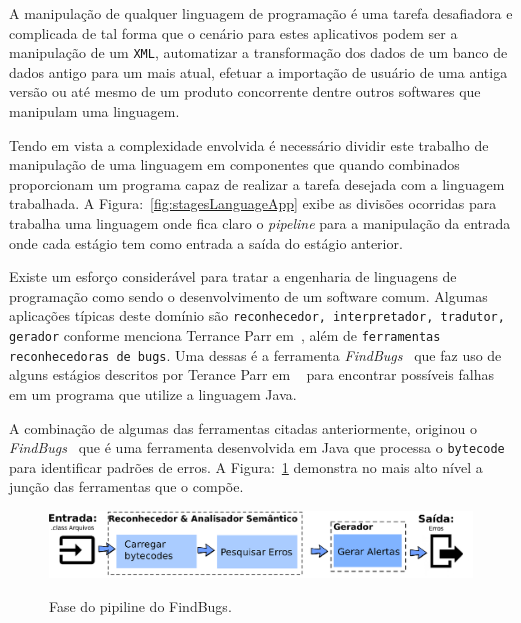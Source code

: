 A manipulaç\~{a}o de qualquer linguagem de programaç\~{a}o \'{e} uma tarefa desafiadora e complicada de tal forma que o cen\'{a}rio para estes aplicativos podem ser a manipulaç\~{a}o de um \texttt{XML}, automatizar a transformaç\~{a}o dos dados de um banco de dados antigo para um mais atual, efetuar a importaç\~{a}o de usu\'{a}rio de uma antiga vers\~{a}o ou at\'{e} mesmo de um produto concorrente dentre outros softwares que manipulam uma linguagem.

Tendo em vista a complexidade envolvida \'{e} necess\'{a}rio dividir este trabalho de manipulaç\~{a}o de uma linguagem em componentes que quando combinados proporcionam um programa capaz de realizar a tarefa desejada com a linguagem trabalhada. A Figura:~\ref{fig:stagesLanguageApp} exibe as divis\~{o}es ocorridas para trabalha uma linguagem onde fica claro o \textit{pipeline} para a manipulaç\~{a}o da entrada onde cada est\'{a}gio tem como entrada a sa\'{i}da do est\'{a}gio anterior.

Existe um esfor\c{c}o consider\'{a}vel para tratar a engenharia de linguagens de programaç\~{a}o como sendo o desenvolvimento de um software comum. Algumas aplicaç\~{o}es t\'{i}picas deste dom\'{i}nio s\~{a}o \texttt{reconhecedor, interpretador, tradutor, gerador} conforme menciona Terrance Parr em~\cite{Parr:2009:LIP:1823613},  al\'{e}m de \texttt{ferramentas reconhecedoras de bugs}. Uma dessas \'{e} a ferramenta \textit{FindBugs}~\cite{FindBugs} que faz uso de alguns est\'{a}gios descritos por Terance Parr em ~\cite{Parr:2009:LIP:1823613} para encontrar poss\'{i}veis falhas em um programa que utilize a linguagem Java.

A combinaç\~{a}o de algumas das ferramentas citadas anteriormente, originou o \textit{FindBugs}~\cite{FindBugs} que \'{e} uma ferramenta desenvolvida em Java que processa o \texttt{bytecode} para identificar padr\~{o}es de erros. A Figura:~\ref{fig:findBugs} demonstra no mais alto n\'{i}vel a junç\~{a}o das ferramentas que o comp\~{o}e. 

\begin{figure}[h]
	\center
	\includegraphics[scale=0.9]{Imagens/pipelineFindbugs}
	\label{fig:findBugs}
	\caption{Fase do pipiline do FindBugs.}
\end{figure}

